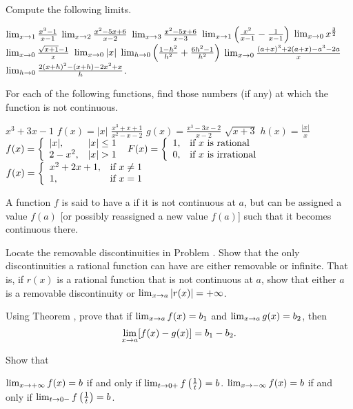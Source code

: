 \begin{exercises}

Compute the following limits.
\begin{exenum}
\sx
$\lim_{x \rightarrow 1} \frac{x^3-1}{x-1}$
\sx
$\lim_{x \rightarrow 2} \frac{x^2 - 5x +6}{x-2}$
\sx
$\lim_{x \rightarrow 3} \frac{x^2-5x+6}{x-3}$
\sx
$\lim_{x \rightarrow 1} \left( \frac{x^2}{x-1} - \frac{1}{x-1} \right)$
\sx
$\lim_{x \rightarrow 0} x^{\frac32}$
\sx
$\lim_{x \rightarrow 0} \frac{\sqrt{x+1}-1}x$
\sx
$\lim_{x \rightarrow 0} |x|$
\sx
$\lim_{h \rightarrow 0} \left( \frac{1-h^2}{h^2} + \frac{6h^2-1}{h^2} \right )$
\sx
$\lim_{x \rightarrow 0} \frac{(a+x)^3 + 2(a+x) - a^3 - 2a}x$
\sx
$\lim_{h \rightarrow 0} \frac{2(x+h)^2 - (x+h) - 2x^2 +x}h$.
\end{exenum}

For each of the following functions, find those numbers (if any)
at which the function is not continuous.
\begin{exenum}
\sx
$x^3 + 3x - 1$
\sx
$f(x) = |x|$
\sx
$\frac{x^3+x+1}{x^2-x-2}$
\sx
$g(x) = \frac{x^3-3x-2}{x-2}$
\sx
$\sqrt{x+3}$
\sx
$h(x) = \frac{|x|}x$
\sx
$f(x) = \left\{ \begin{array}{ll} |x|,&  |x| \leq 1 \\ 2-x^2,&  |x| > 1 \end{array} \right.$
\sx
$F(x)= \left\{ \begin{array}{ll} 1,& \mbox{if $x$ is rational} \\ 0,& \mbox{if $x$ is irrational} \end{array} \right.$
\sx
$f(x)= \left\{ \begin{array}{ll} x^2 +2x +1,& \mbox{if $x \ne 1$} \\ 1,& \mbox{if  $x = 1$} \end{array} \right.
$
\end{exenum}

A function $f$ is said to have a  if it is not continuous at $a$,
but can be assigned a value $f(a)$ [or possibly reassigned a new value $f(a)$]
such that it becomes continuous there.
\begin{exenum}
\sx
Locate the removable discontinuities in Problem .
\sx
Show that the only discontinuities a rational function can have are either
removable or infinite.  That is, if $r(x)$ is a rational function that is not
continuous at $a$, show that either $a$ is a removable discontinuity
or $\lim_{x \rightarrow a} |r(x)| = + \infty$.
\end{exenum}

Using Theorem , prove that if $\lim_{x \rightarrow a} f(x) = b_1$ and
$\lim_{x \rightarrow a} g(x) = b_2$, then
\[
\lim_{x \rightarrow a} [f(x)-g(x)] = b_1 - b_2
.
\]

Show that
\begin{exenum}
\sx
$\lim_{x \rightarrow +\infty} f(x)=b$ if and only if 
$\lim_{t \rightarrow 0+} f \left( \frac1t \right) = b$.
\sx
$\lim_{x \rightarrow -\infty} f(x)=b$ if and only if 
$\lim_{t \rightarrow 0-} f \left( \frac1t \right) = b$.
\end{exenum}


\end{exercises}
